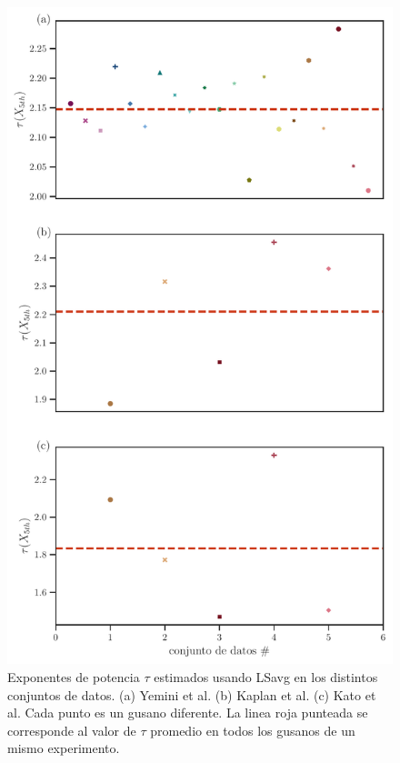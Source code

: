   


 \begin{figure}[h!]
 	\centering\includegraphics[width=\imsize]{exponentes_experimentos.pdf}
 	\caption[ Exponentes de potencia $\tau$ estimados usando LSavg en los distintos conjuntos de datos. (a) Yemini et al. (b) Kaplan et al. (c) Kato et al. Cada punto es un gusano diferente. ]{ Exponentes de potencia $\tau$ estimados usando LSavg en los distintos conjuntos de datos. (a) Yemini et al. (b) Kaplan et al. (c) Kato et al. Cada punto es un gusano diferente. La linea roja punteada se corresponde al valor de $\tau$ promedio en todos los gusanos de un mismo experimento. } \label{fig:exponentes_experimentos}
 \end{figure}
 
